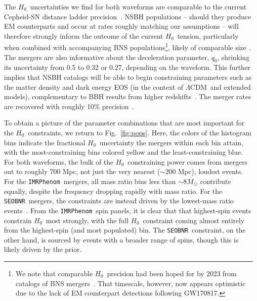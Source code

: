 \documentclass[%
 reprint,
 superscriptaddress,
 nofootinbib,
 amsmath,amssymb,
 aps,
]{revtex4-2}
\newcommand{\msun}{M_\odot}
\newcommand{\hubble}{\ensuremath{H_0}}
\newcommand{\lcdm}{$\Lambda$CDM}
\newcommand{\seobnr}{\texttt{SEOBNR}}
\newcommand{\imrp}{\texttt{IMRPhenom}}
\begin{document}
The \hubble\ uncertainties we find for both waveforms are comparable to the current Cepheid-SN distance ladder precision~\cite{Riess_etal:2019}. NSBH populations -- should they produce EM counterparts and occur at rates roughly matching our assumptions -- will therefore strongly inform the outcome of the current \hubble\ tension, particularly when combined with accompanying BNS populations\footnote{We note that comparable \hubble\ precision had been hoped for by 2023 from catalogs of BNS mergers~\cite{Chen_etal:2018}. That timescale, however, now appears optimistic due to the lack of EM counterpart detections following GW170817.}, likely of comparable size~\cite{Chen_etal:2018,Feeney_etal:2018,Vitale_Chen:2018,Mortlock_etal:2019}. The mergers are also informative about the deceleration parameter, $q_0$, shrinking its uncertainty from 0.5 to 0.32 or 0.27, depending on the waveform. This further implies that NSBH catalogs will be able to begin constraining parameters such as the matter density and dark energy EOS (in the context of \lcdm\ and extended models), complementary to BBH results from higher redshifts~\cite{Farr_etal:2019,Chen_etal:2020,Mukherjee_etal:2020}. The merger rates are recovered with roughly 10\% precision~\cite[e.g.,][]{Ligo:2018,Abbott_etal:2018,LVC:2020O3acat,LVC_O2_pop}.

To obtain a picture of the parameter combinations that are most important for the \hubble\ constraints, we return to Fig.~\ref{fig:pops}. Here, the colors of the histogram bins indicate the fractional \hubble\ uncertainty the mergers within each bin attain, with the most-constraining bins colored yellow and the least-constraining blue. For both waveforms, the bulk of the \hubble\ constraining power comes from mergers out to roughly 700 Mpc, not just the very nearest ($\sim$200 Mpc), loudest events. For the \imrp\ mergers, all mass ratio bins less than $\sim$8$\msun$ contribute equally, despite the frequency dropping rapidly with mass ratio. For the \seobnr\ mergers, the constraints are instead driven by the lowest-mass ratio events~\cite[e.g., ][]{Apostolatos_etal:1994,Cutler_Flanagan:1994}. From the \imrp\ spin panels, it is clear that that highest-spin events constrain \hubble\ most strongly, with the full \hubble\ constraint coming almost entirely from the highest-spin (and most populated) bin. The \seobnr\ constraint, on the other hand, is sourced by events with a broader range of spins, though this is likely driven by the prior.
\end{document}
